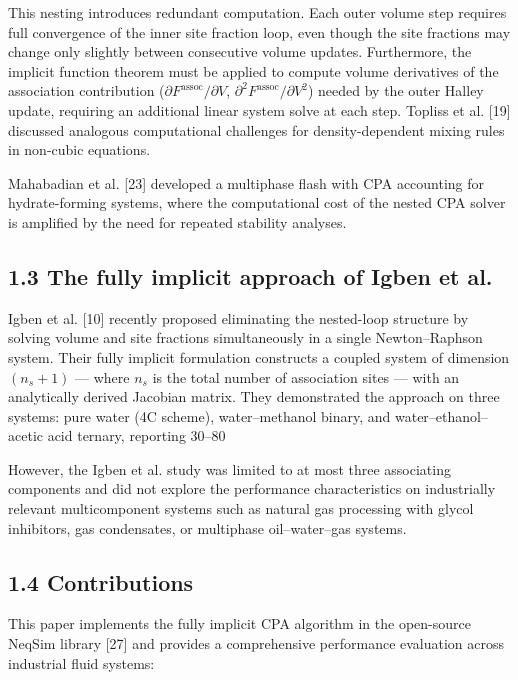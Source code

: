 \documentclass[review,3p]{elsarticle}
\begin{document}
This nesting introduces redundant computation. Each outer volume step requires full convergence of the inner site fraction loop, even though the site fractions may change only slightly between consecutive volume updates. Furthermore, the implicit function theorem must be applied to compute volume derivatives of the association contribution ($\partial F^{\text{assoc}}/\partial V$, $\partial^2 F^{\text{assoc}}/\partial V^2$) needed by the outer Halley update, requiring an additional linear system solve at each step. Topliss et al. [19] discussed analogous computational challenges for density-dependent mixing rules in non-cubic equations.

Mahabadian et al. [23] developed a multiphase flash with CPA accounting for hydrate-forming systems, where the computational cost of the nested CPA solver is amplified by the need for repeated stability analyses.

\subsection{1.3 The fully implicit approach of Igben et al.}

Igben et al. [10] recently proposed eliminating the nested-loop structure by solving volume and site fractions simultaneously in a single Newton–Raphson system. Their fully implicit formulation constructs a coupled system of dimension $(n_s + 1)$ — where $n_s$ is the total number of association sites — with an analytically derived Jacobian matrix. They demonstrated the approach on three systems: pure water (4C scheme), water–methanol binary, and water–ethanol–acetic acid ternary, reporting 30–80%

However, the Igben et al. study was limited to at most three associating components and did not explore the performance characteristics on industrially relevant multicomponent systems such as natural gas processing with glycol inhibitors, gas condensates, or multiphase oil–water–gas systems.

\subsection{1.4 Contributions}

This paper implements the fully implicit CPA algorithm in the open-source NeqSim library [27] and provides a comprehensive performance evaluation across industrial fluid systems:
\end{document}
